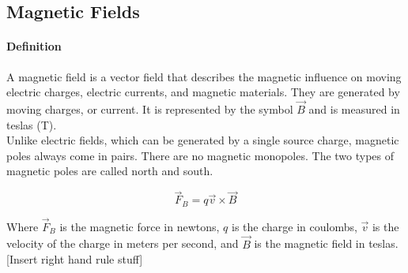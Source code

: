 \subsection{Magnetic Fields}
\hrulefill

\paragraph*{Definition}
    A magnetic field is a vector field that describes the magnetic influence on moving electric charges, 
electric currents, and magnetic materials. They are generated by moving charges, or current. 
It is represented by the symbol $\vec{B}$ and is measured in teslas (T).\\

    Unlike electric fields, which can be generated by a single source charge, magnetic poles always come in pairs. 
There are no magnetic monopoles. The two types of magnetic poles are called north and south.

\begin{equation*}
    \vec{F}_B = q\vec{v} \times \vec{B}
\end{equation*}

    Where $\vec{F}_B$ is the magnetic force in newtons, $q$ is the charge in coulombs, $\vec{v}$ is the velocity
of the charge in meters per second, and $\vec{B}$ is the magnetic field in teslas. [Insert right hand rule stuff]